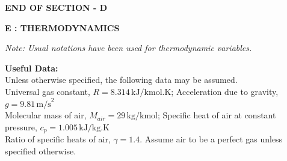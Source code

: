 \documentclass[12pt]{article}
\begin{document}
\begin{center}
\textbf{END OF SECTION - D}
\end{center}

\newpage

\begin{center}
{\Large\textbf{E : THERMODYNAMICS}}
\end{center}



\textit{Note: Usual notations have been used for thermodynamic variables.}

\textbf{Useful Data:} \\
Unless otherwise specified, the following data may be assumed. \\
Universal gas constant, $R = 8.314 \, \text{kJ/kmol.K}$; Acceleration due to gravity, $g = 9.81 \, \text{m/s}^2$ \\
Molecular mass of air, $M_{air} = 29 \, \text{kg/kmol}$; Specific heat of air at constant pressure, $c_p = 1.005 \, \text{kJ/kg.K}$ \\
Ratio of specific heats of air, $\gamma = 1.4$. Assume air to be a perfect gas unless specified otherwise.
\end{document}
